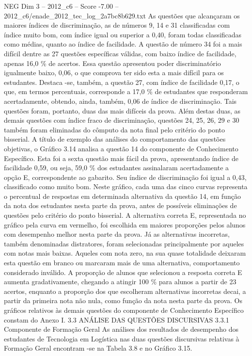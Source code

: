 \begin{textsample}{NEG Dim 3 – 2012\_c6 – Score -7.00 – 2012\_c6/enade\_2012\_tec\_log\_2a7bc8b629.txt}
As questões que alcançaram os maiores índices de discriminação, as de números 9, 14 e 31 classificadas com índice muito bom, com índice igual ou superior a 0,40, foram todas classificadas como médias, quanto ao índice de facilidade.
A questão de número 34 foi a mais difícil dentre as 27 questões específicas válidas, com baixo índice de facilidade, apenas 16,0 \% de acertos.
Essa questão apresentou poder discriminatório igualmente baixo, 0,06, o que comprova ter sido esta a mais difícil para os estudantes.
Destaca -se, também, a questão 27, com índice de facilidade 0,17, o que, em termos percentuais, corresponde a 17,0 \% de estudantes que responderam acertadamente, obtendo, ainda, também, 0,06 de índice de discriminação.
Tais questões foram, portanto, duas das mais difíceis da prova.
Além destas duas, as demais questões com índice fraco de discriminação, questões 24, 25, 26, 29 e 30 também foram eliminadas do cômputo da nota final pelo critério do ponto bisserial.
A título de exemplo das análises do comportamento das questões objetivas, o Gráfico 3.14 analisa a questão 14 do componente de Conhecimento Específico.
Esta foi a sexta questão mais fácil da prova, apresentando índice de facilidade 0,59, ou seja, 59,0 \% dos estudantes assinalaram acertadamente a opção E, correspondente ao gabarito.
Seu índice de discriminação foi igual a 0,43, classificado como muito bom.
Neste gráfico, cada uma das cinco curvas representa o percentual de respostas em determinada alternativa da questão 14, em função da nota dos estudantes nesta parte da prova, antes de possíveis eliminações de questões pelo critério do ponto bisserial.
A alternativa correta E, representada no gráfico pela curva em vermelho, foi escolhida em maiores proporções pelos alunos com desempenho melhor nesta parte da prova.
Já as alternativas incorretas, também denominadas distratores, foram selecionadas principalmente por aqueles com notas mais baixas.
Aqueles com nota zero, na sua quase totalidade deixaram esta questão em branco ou marcaram mais de uma alternativa, comportamento considerado inválido.
A proporção de alunos que selecionou a resposta correta E aumenta gradativamente, chegando a atingir 100 \% para alunos a partir de 23 acertos, enquanto a proporção dos que escolheram alternativas incorretas decai, a partir da primeira nota não nula, como função da nota nesta parte da prova.
Os gráficos relativos às demais questões do componente de Conhecimento Específico constam do Anexo I. 3.3 ANÁLISE DAS QUESTÕES DISCURSIVAS 3.3.1 Componente de Formação Geral As análises dos resultados de desempenho dos estudantes de Tecnologia em Logística nas duas questões discursivas relativas à Formação Geral encontram -se na Tabela 3.8 e no Gráfico 3.15.

\end{textsample}
